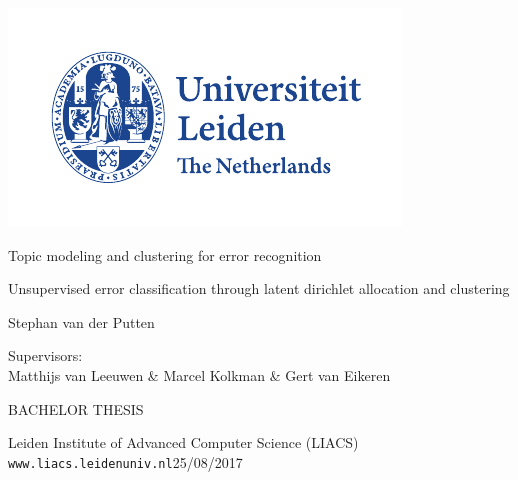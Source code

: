 \thispagestyle{empty}

\includegraphics{logoleiden}


\vspace{-2.5cm}\hfill {}

\vspace{5cm}
\begin{Large}
\hfill Topic modeling and clustering for error recognition 

\vspace*{3mm}

\hfill Unsupervised error classification through latent dirichlet allocation and clustering 

\vspace*{14mm}

\hfill Stephan van der Putten
\end{Large}

\vspace*{4.5cm}

\begin{large}

Supervisors:\\
Matthijs van Leeuwen \& Marcel Kolkman \& Gert van Eikeren


\vspace*{2.8cm}
BACHELOR THESIS

\vspace*{5mm}
Leiden Institute of Advanced Computer Science (LIACS)\\
\texttt{www.liacs.leidenuniv.nl}\hfill 25/08/2017
\end{large}

